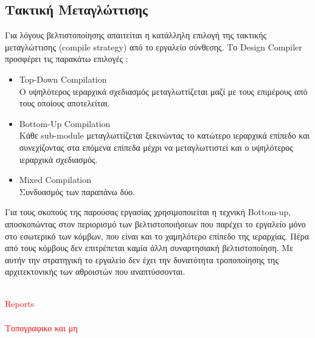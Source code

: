 \subsection{Τακτική Μεταγλώττισης}

Για λόγους βελτιστοποίησης απαιτείται η κατάλληλη επιλογή της τακτικής μεταγλώττισης (compile strategy) από το εργαλείο σύνθεσης. Το Design Compiler προσφέρει τις παρακάτω επιλογές :
\begin{itemize}
  \item Top-Down Compilation\\
  Ο υψηλότερος ιεραρχικά σχεδιασμός μεταγλωττίζεται μαζί με τους επιμέρους από τους οποίους αποτελείται.
  \item Bottom-Up Compilation\\
  Κάθε sub-module μεταγλωττίζεται ξεκινώντας το κατώτερο ιεραρχικά επίπεδο και συνεχίζοντας στα επόμενα επίπεδα μέχρι να μεταγλωττιστεί και ο υψηλότερος ιεραρχικά σχεδιασμός.
  \item Mixed Compilation\\
  Συνδυασμός των παραπάνω δύο.
\end{itemize}
Για τους σκοπούς της παρούσας εργασίας χρησιμοποιείται η τεχνική Bottom-up, αποσκοπώντας στον περιορισμό των βελτιστοποιήσεων που παρέχει το εργαλείο μόνο στο εσωτερικό των κόμβων, που είναι και το χαμηλότερο επίπεδο της ιεραρχίας. Πέρα από τους κόμβους δεν επιτρέπεται καμία άλλη συναρτησιακή βελτιστοποίηση. Με αυτήν την στρατηγική το εργαλείο δεν έχει την δυνατότητα τροποποίησης της αρχιτεκτονικής των αθροιστών που αναπτύσσονται.

\textcolor{red}{ \\Reports\\\\Τοπογραφικο και μη}











\clearpage
